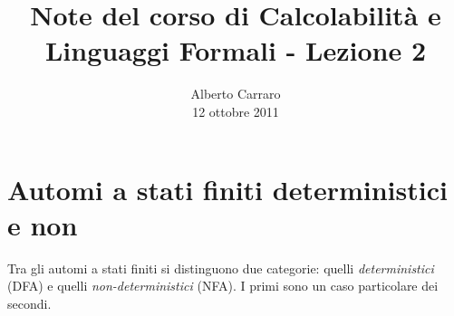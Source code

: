 \documentclass[runningheads,a4paper]{llncs}
\begin{document}
\mainmatter  %

\title{Note del corso di Calcolabilit\`{a} e Linguaggi Formali - Lezione 2}


%
%
\author{Alberto Carraro \\ 12 ottobre 2011}
%


%
%




\maketitle

\section{Automi a stati finiti deterministici e non}

Tra gli automi a stati finiti si distinguono due categorie: quelli \emph{deterministici} (DFA) e quelli \emph{non-deterministici} (NFA). I primi sono un caso particolare dei secondi.
\end{document}
